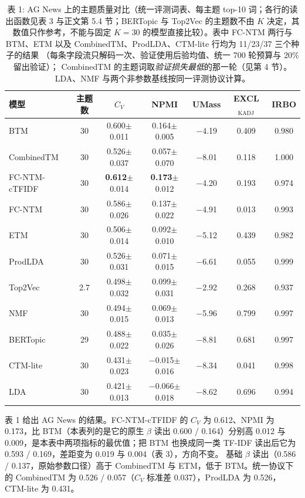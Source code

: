 \documentclass{article}
\begin{document}
\begin{table}[t]
\centering
\caption{表 1: AG News 上的主题质量对比（统一评测词表、每主题 top-10 词；各行的读出函数见表
3 与正文第 5.4 节；BERTopic 与 Top2Vec 的主题数不由 $K$
决定，其数值只作参考，不能与固定 $K=30$ 的模型直接比较）。表中 FC-NTM 两行与
BTM、ETM 以及 CombinedTM、ProdLDA、CTM-lite 行均为 11/23/37 三个种子的结果
（每条字段流只解码一次、验证使用后验均值、统一 700 轮预算与 20\% 留出验证）；
CombinedTM 的主题词取\emph{验证损失最低}的那一轮（见第 4 节）。
LDA、NMF 与两个非参数基线按同一评测协议计算。}
\label{tab:agnews}
\small
\begin{tabular}{lcccccc}
\toprule
模型 & 主题数 & $C_V$ & NPMI & UMass & EXCL$_{\mathrm{KADJ}}$ & IRBO \\
\midrule
BTM & 30 & 0.600$\pm$0.011 & 0.164$\pm$0.005 & $-$4.19 & 0.409 & 0.980 \\
CombinedTM & 30 & 0.526$\pm$0.037 & 0.057$\pm$0.070 & $-$8.01 & 0.118 & 1.000 \\
FC-NTM-cTFIDF & 30 & \textbf{0.612}$\pm$0.014 & \textbf{0.173}$\pm$0.012 & $-$4.20 & 0.193 & 0.974 \\
FC-NTM & 30 & 0.586$\pm$0.026 & 0.137$\pm$0.022 & $-$4.91 & 0.013 & 0.993 \\
ETM & 30 & 0.506$\pm$0.014 & 0.092$\pm$0.010 & $-$5.12 & 0.439 & 0.982 \\
ProdLDA & 30 & 0.526$\pm$0.031 & 0.071$\pm$0.015 & $-$6.61 & 0.055 & 0.999 \\
Top2Vec & 2.7 & 0.498$\pm$0.032 & 0.099$\pm$0.031 & $-$2.92 & 0.268 & 0.937 \\
NMF & 30 & 0.494$\pm$0.015 & 0.069$\pm$0.013 & $-$5.96 & 0.799 & 0.997 \\
BERTopic & 29 & 0.488$\pm$0.022 & 0.035$\pm$0.026 & $-$8.81 & 0.681 & 0.997 \\
CTM-lite & 30 & 0.431$\pm$0.023 & $-$0.015$\pm$0.016 & $-$8.34 & 0.041 & 0.998 \\
LDA & 30 & 0.421$\pm$0.013 & $-$0.066$\pm$0.018 & $-$8.62 & 0.696 & 0.994 \\
\bottomrule
\end{tabular}
\end{table}

表 1 给出 AG News 的结果。FC-NTM-cTFIDF 的
$C_V$ 为 0.612、NPMI 为 0.173，比 BTM（本表列的是它的原生 $\beta$ 读出
0.600 / 0.164）分别高 0.012 与 0.009，是本表中两项指标的最优值；把 BTM 也换成同一类
TF-IDF 读出后它为 0.593 / 0.169，差距变为 0.019 与 0.004（表 3），方向不变。
基础 $\beta$ 读出（0.586 / 0.137，原始参数口径）高于 CombinedTM 与 ETM，低于 BTM。统一协议下的
CombinedTM 为 0.526 / 0.057（$C_V$ 标准差 0.037），ProdLDA 为 0.526，CTM-lite 为 0.431。
\end{document}
